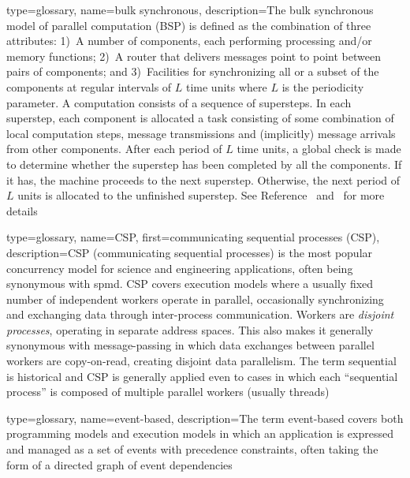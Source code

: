 {
  type=glossary,
  name={bulk synchronous},
  description={The bulk synchronous model of parallel computation (BSP) is
  defined as the combination of three attributes: 1)~A number of
  components, each performing processing and/or memory functions; 2)~A
  router that delivers messages point to point between pairs of
  components; and 3)~Facilities for synchronizing all or a subset of
  the components at regular intervals of $L$ time units where $L$ is
  the periodicity parameter.  A computation consists of a sequence of
  supersteps. In each superstep, each component is allocated a task
  consisting of some combination of local computation steps, message
  transmissions and (implicitly) message arrivals from other
  components. After each period of $L$ time units, a global check is
  made to determine whether the superstep has been completed by all
  the components. If it has, the machine proceeds to the next
  superstep. Otherwise, the next period of $L$ units is allocated to
  the unfinished superstep.  See Reference~\cite{BSP}
  and~\cite{wikiBSP} for more details} 
}

{
  type=glossary,
  name={CSP},
  first={communicating sequential processes (CSP)},
  description={CSP (communicating sequential processes) is the most popular
    concurrency model for science and engineering applications, often being
      synonymous with \gls{spmd}. CSP covers execution models where a usually fixed number of independent workers operate in parallel,
      occasionally synchronizing and exchanging data through inter-process communication. Workers are \emph{disjoint processes},
      operating in separate address spaces.  This also makes it generally synonymous with message-passing in which data exchanges between parallel workers are copy-on-read, creating disjoint data parallelism.  The term sequential is historical and CSP is generally applied even to cases in which each ``sequential process'' is composed of multiple parallel workers (usually threads)}
}

{
  type=glossary,
  name={event-based},
  description={The term event-based covers both \glspl{programming model} and
    \glspl{execution model} in which an application is expressed and managed as a set of events with precedence constraints, often taking the form of a directed graph of event dependencies}
}

